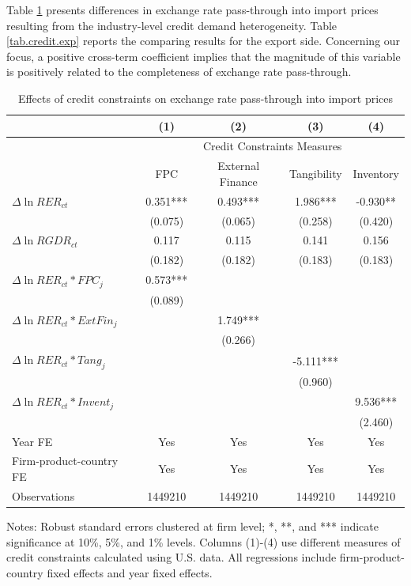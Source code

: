 Table \ref{tab.credit} presents differences in exchange rate pass-through into import prices resulting from the industry-level credit demand heterogeneity. Table \ref{tab.credit.exp} reports the comparing results for the export side. Concerning our focus, a positive cross-term coefficient implies that the magnitude of this variable is positively related to the completeness of exchange rate pass-through.

\begin{table}[htb]
	\centering
	\caption{Effects of credit constraints on exchange rate pass-through into import prices}
	\begin{threeparttable}	
		\begin{tabular}{lcccc}
			\toprule
			& (1)   & (2)   & (3)   & (4) \\
			\midrule
			 & \multicolumn{4}{c}{Credit Constraints Measures} \\
			& FPC   & External Finance & Tangibility & Inventory \\
			\midrule
			$\Delta \ln RER_{ct}$ & 0.351*** & 0.493*** & 1.986*** & -0.930** \\
			& (0.075) & (0.065) & (0.258) & (0.420) \\
			$\Delta \ln RGDR_{ct}$ & 0.117 & 0.115 & 0.141 & 0.156 \\
			& (0.182) & (0.182) & (0.183) & (0.183) \\
			$\Delta \ln RER_{ct}*FPC_{j}$ & 0.573*** &       &       &  \\
			& (0.089) &       &       &  \\
			$\Delta \ln RER_{ct}*ExtFin_{j}$ &    & 1.749*** &       &  \\
			&   & (0.266) &       &  \\
			$\Delta \ln RER_{ct}*Tang_{j}$ &   &       & -5.111*** &  \\
			&   &       & (0.960) &  \\
			$\Delta \ln RER_{ct}*Invent_{j}$ &    &       &       & 9.536*** \\
			&   &       &       & (2.460) \\
			Year FE  & Yes   & Yes   & Yes   & Yes \\
			Firm-product-country FE & Yes   & Yes   & Yes   & Yes \\
			Observations & 1449210 & 1449210 & 1449210 & 1449210 \\
			\bottomrule
		\end{tabular}
		\begin{tablenotes}
			\footnotesize
			\item[Notes:] Robust standard errors clustered at firm level;  *, **, and *** indicate significance at 10\%, 5\%, and 1\% levels. Columns (1)-(4) use different measures of credit constraints calculated using U.S. data. All regressions include firm-product-country fixed effects and year fixed effects.
		\end{tablenotes}
	\end{threeparttable}
	\label{tab.credit}
\end{table}

